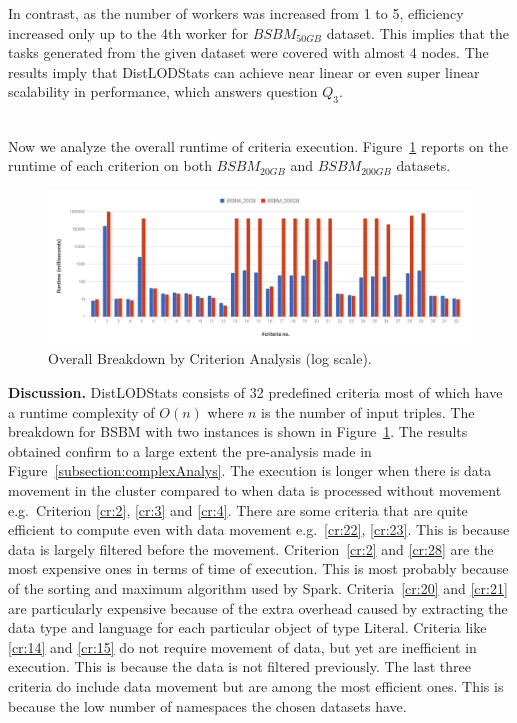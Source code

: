 In contrast, as the number of workers was increased from 1 to 5, efficiency increased only up to the 4th worker for $BSBM_{50GB}$ dataset.
This implies that the tasks generated from the given dataset were covered with almost 4 nodes.
The results imply that DistLODStats can achieve near linear or even super linear scalability in performance, which answers question $Q_3$.

\hspace*{\fill} \\
Now we analyze the overall runtime of criteria execution.
Figure~\ref{fig:Breakdown} reports on the runtime of each criterion on both $BSBM_{20GB}$ and $BSBM_{200GB}$ datasets.

\begin{figure}
\centering
\includegraphics[width=1\columnwidth]{images/4_distlodstats/distlodstats-overall-breakdown.pdf}
\caption{Overall Breakdown by Criterion Analysis (log scale).}
\label{fig:Breakdown}
\end{figure}

\textbf{Discussion.}
DistLODStats consists of 32 predefined criteria most of which have a runtime complexity of $O(n)$ where $n$ is the number of input triples. The breakdown for BSBM with two instances is shown in Figure~\ref{fig:Breakdown}.
The results obtained confirm to a large extent the pre-analysis made in Figure~\ref{subsection:complexAnalys}.
The execution is longer when there is data movement in the cluster compared to when data is processed without movement e.g.~Criterion \ref{cr:2}, \ref{cr:3} and \ref{cr:4}.
There are some criteria that are quite efficient to compute even with data movement e.g.~\ref{cr:22}, \ref{cr:23}. This is because data is largely filtered before the movement. 
Criterion~\ref{cr:2} and \ref{cr:28} are the most expensive ones in terms of time of execution.
This is most probably because of the sorting and maximum algorithm used by Spark.
Criteria~\ref{cr:20} and \ref{cr:21} are particularly expensive because of the extra overhead caused by extracting the data type and language for each particular object of type Literal.
Criteria like \ref{cr:14} and \ref{cr:15} do not require movement of data, but yet are inefficient in execution. This is because the data is not filtered previously.
The last three criteria do include data movement but are among the most efficient ones.
This is because the low number of namespaces the chosen datasets have.

